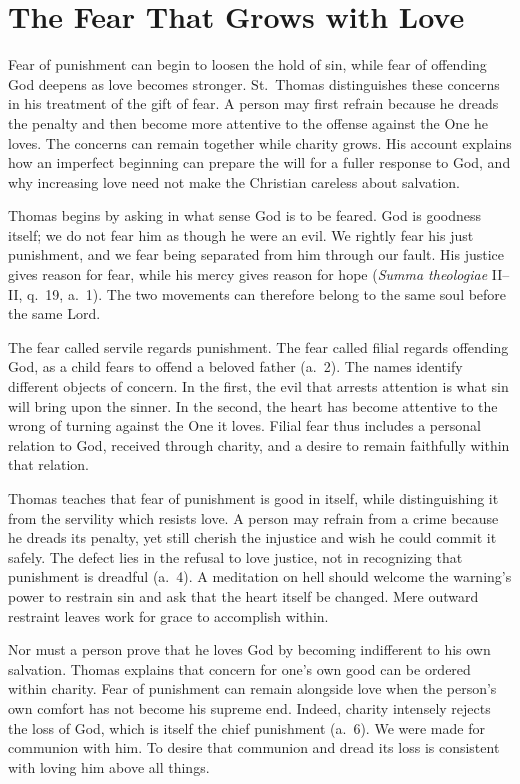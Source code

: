 \section{The Fear That Grows with Love}

Fear of punishment can begin to loosen the hold of sin, while fear of offending God deepens as love becomes stronger. St.~Thomas distinguishes these concerns in his treatment of the gift of fear. A person may first refrain because he dreads the penalty and then become more attentive to the offense against the One he loves. The concerns can remain together while charity grows. His account explains how an imperfect beginning can prepare the will for a fuller response to God, and why increasing love need not make the Christian careless about salvation.

Thomas begins by asking in what sense God is to be feared. God is goodness itself; we do not fear him as though he were an evil. We rightly fear his just punishment, and we fear being separated from him through our fault. His justice gives reason for fear, while his mercy gives reason for hope (\emph{Summa theologiae} II--II, q.~19, a.~1). The two movements can therefore belong to the same soul before the same Lord.

The fear called servile regards punishment. The fear called filial regards offending God, as a child fears to offend a beloved father (a.~2). The names identify different objects of concern. In the first, the evil that arrests attention is what sin will bring upon the sinner. In the second, the heart has become attentive to the wrong of turning against the One it loves. Filial fear thus includes a personal relation to God, received through charity, and a desire to remain faithfully within that relation.

Thomas teaches that fear of punishment is good in itself, while distinguishing it from the servility which resists love. A person may refrain from a crime because he dreads its penalty, yet still cherish the injustice and wish he could commit it safely. The defect lies in the refusal to love justice, not in recognizing that punishment is dreadful (a.~4). A meditation on hell should welcome the warning's power to restrain sin and ask that the heart itself be changed. Mere outward restraint leaves work for grace to accomplish within.

Nor must a person prove that he loves God by becoming indifferent to his own salvation. Thomas explains that concern for one's own good can be ordered within charity. Fear of punishment can remain alongside love when the person's own comfort has not become his supreme end. Indeed, charity intensely rejects the loss of God, which is itself the chief punishment (a.~6). We were made for communion with him. To desire that communion and dread its loss is consistent with loving him above all things.

